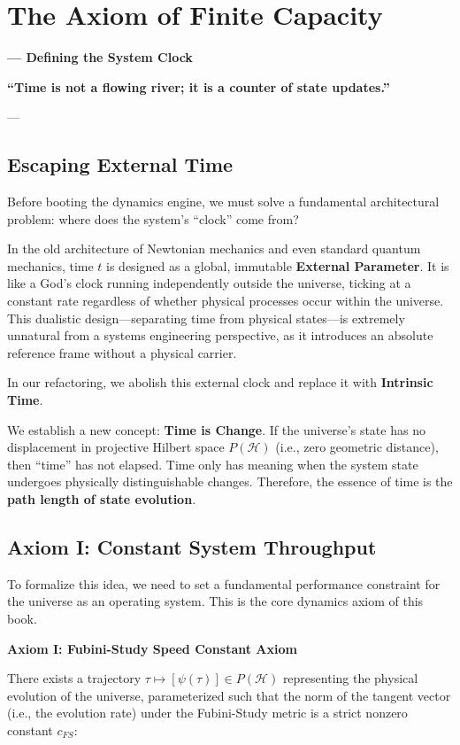 \documentclass[11pt,a4paper,twoside]{book}
\begin{document}
 \section{The Axiom of Finite Capacity}

\textbf{--- Defining the System Clock}

\textbf{``Time is not a flowing river; it is a counter of state updates.''}

---

\subsection{Escaping External Time}

Before booting the dynamics engine, we must solve a fundamental architectural problem: where does the system's ``clock'' come from?

In the old architecture of Newtonian mechanics and even standard quantum mechanics, time \textbf{$t$} is designed as a global, immutable \textbf{External Parameter}. It is like a God's clock running independently outside the universe, ticking at a constant rate regardless of whether physical processes occur within the universe. This dualistic design---separating time from physical states---is extremely unnatural from a systems engineering perspective, as it introduces an absolute reference frame without a physical carrier.

In our refactoring, we abolish this external clock and replace it with \textbf{Intrinsic Time}.

We establish a new concept: \textbf{Time is Change}. If the universe's state has no displacement in projective Hilbert space \textbf{$P(\mathcal{H})$} (i.e., zero geometric distance), then ``time'' has not elapsed. Time only has meaning when the system state undergoes physically distinguishable changes. Therefore, the essence of time is the \textbf{path length of state evolution}.

\subsection{Axiom I: Constant System Throughput}

To formalize this idea, we need to set a fundamental performance constraint for the universe as an operating system. This is the core dynamics axiom of this book.

\textbf{Axiom I: Fubini-Study Speed Constant Axiom}

There exists a trajectory \textbf{$\tau \mapsto [\psi(\tau)] \in P(\mathcal{H})$} representing the physical evolution of the universe, parameterized such that the norm of the tangent vector (i.e., the evolution rate) under the Fubini-Study metric is a strict nonzero constant \textbf{$c_{FS}$}:
\end{document}
